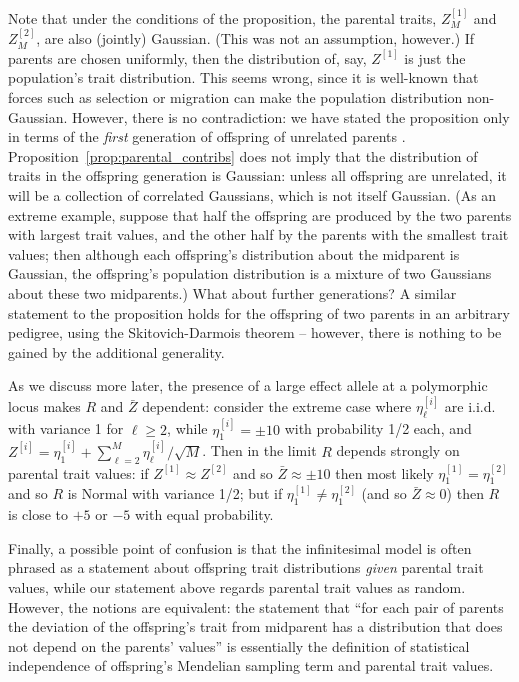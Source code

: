 \documentclass{article}
\newcommand{\1}{\mathbbm{1}}
\theoremstyle{remark}
\theoremstyle{definition}
\begin{document}
Note that under the conditions of the proposition, 
the parental traits, $Z^{[1]}_M$ and $Z^{[2]}_M$,
are also (jointly) Gaussian.
(This was not an assumption, however.)
If parents are chosen uniformly, then
the distribution of, say, $Z^{[1]}$ is just the population's trait distribution.
This seems wrong, since it is well-known that forces such as selection or migration
can make the population distribution non-Gaussian.
However, there is no contradiction:
we have stated the proposition only in terms of the \emph{first} generation
of offspring of unrelated parents \citep[as in][]{barton2017infinitesimal}.
Proposition~\ref{prop:parental_contribs} does not imply that
the distribution of traits in the offspring generation is Gaussian:
unless all offspring are unrelated,
it will be a collection of correlated Gaussians,
which is not itself Gaussian.
(As an extreme example, suppose that half the offspring are produced by the two parents
with largest trait values, and the other half by the parents with the smallest trait values;
then although each offspring's distribution about the midparent is Gaussian,
the offspring's population distribution is a mixture of two Gaussians
about these two midparents.)
What about further generations?
A similar statement to the proposition
holds for the offspring of two parents in an arbitrary pedigree,
using the Skitovich-Darmois theorem \citet{kagan1973characterization}
-- however, there is nothing to be gained by the additional generality.

As we discuss more later,
the presence of a large effect allele at a polymorphic locus 
makes $R$ and $\bar Z$ dependent:
consider the extreme case where $\eta^{[i]}_\ell$ are i.i.d.{} with variance 1 for $\ell \ge 2$,
while $\eta^{[i]}_1 = \pm 10$ with probability 1/2 each,
and $Z^{[i]} = \eta_1^{[i]} + \sum_{\ell=2}^M \eta_\ell^{[i]} / \sqrt{M}$.
Then in the limit $R$ depends strongly on parental trait values:
if $Z^{[1]} \approx Z^{[2]}$ and so $\bar Z \approx \pm 10$ then most likely
$\eta_1^{[1]} = \eta_1^{[2]}$ and so $R$ is Normal with variance 1/2;
but if $\eta_1^{[1]} \neq \eta_1^{[2]}$ (and so $\bar Z \approx 0$)
then $R$ is close to $+5$ or $-5$ with equal probability.

Finally, a possible point of confusion is that 
the infinitesimal model is often phrased as a statement about offspring trait distributions
\emph{given} parental trait values,
while our statement above regards parental trait values as random.
However, the notions are equivalent:
the statement that
``for each pair of parents the deviation of the offspring's trait from midparent
has a distribution that does not depend on the parents' values''
is essentially the definition of statistical independence
of offspring's Mendelian sampling term and parental trait values.
\end{document}
